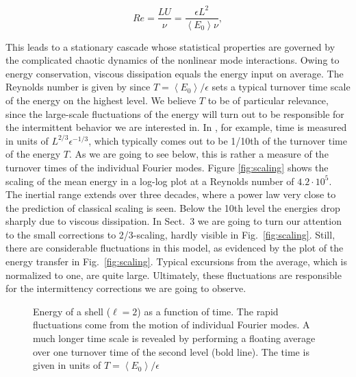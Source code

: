 \documentclass[dc]{svjour}
\begin{document}
\begin{equation}
  \label{re}
    Re = \frac{L U}{\nu} = \frac{\epsilon L^2}{\left< E_0 \right>\nu} ,
\end{equation}

\begin{figure*}%
\sidecaption
{}
  \caption{Log-log-plot of the structure function
    $\tilde{D}_{\ell}^{(2)}=\left<E_{\ell}\right>$ versus level number
    for the small cascade. At large scales, where the influence of
    dissipation is negligible, classical scaling is observed.
    At small scales the
    turbulent motion is damped by viscosity.
    The Reynolds number is $Re = 4.2\cdot10^5$
    }
  \label{fig:scaling}
\end{figure*}

This leads to a
stationary cascade whose statistical properties are governed by the
complicated chaotic dynamics of the nonlinear mode interactions.
Owing to energy conservation, viscous dissipation equals the energy
input on average. The Reynolds number is given by
since $T = \left<E_0\right> / \epsilon$ sets a typical turnover
time scale of the energy on the highest level. We believe
$T$ to be of particular relevance, since the large-scale fluctuations
of the energy will turn out to be responsible for the intermittent
behavior we are interested in. In \cite{grossmann94a}, for example,
time is measured in units of $L^{2/3} \epsilon^{-1/3}$, which
typically comes out to be 1/10th of the turnover time of the energy $T$.
As we are going to see below, this is rather a measure
of the turnover times of the individual Fourier modes.
Figure \ref{fig:scaling} shows the scaling of the mean energy
in a log-log plot at a Reynolds number of $4.2 \cdot 10^5$.
The inertial range extends over three decades, where a power
law very close to the prediction of classical scaling is seen.
Below the 10th level the energies drop sharply due to viscous
dissipation. In Sect.~3 we are going to turn
our attention to the small corrections to 2/3-scaling, hardly
visible in Fig.~\ref{fig:scaling}. Still, there are considerable
fluctuations in this model, as evidenced by the plot of the energy
transfer in Fig.~\ref{fig:scaling}. Typical excursions from the
average, which is normalized to one, are quite large. Ultimately,
these fluctuations are responsible for the intermittency
corrections we are going to observe.

\begin{figure}%
  \caption{Energy of a shell ($\ell=2$) as a function of time.
    The rapid fluctuations come
    from the motion of individual Fourier modes.
    A much longer time scale is revealed by performing a
    floating average over one turnover time of
    the second level (bold line).
    The time is given in units of $T = \left<E_{0}\right>/\epsilon$}
  \label{fig:energy}
\end{figure}
\end{document}
